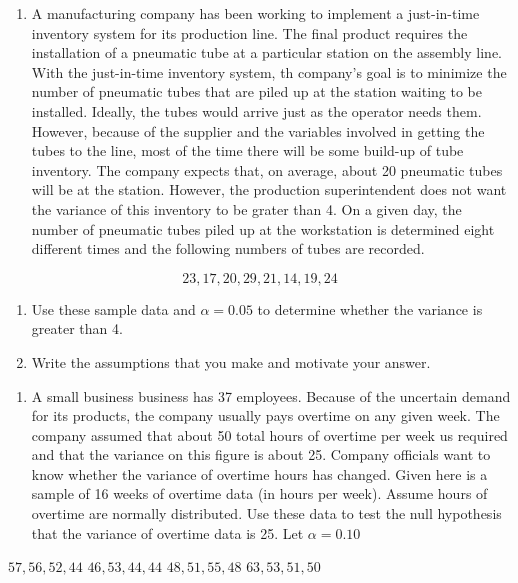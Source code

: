 \documentclass[]{book}
\providecommand{\tightlist}{%
  \setlength{\itemsep}{0pt}\setlength{\parskip}{0pt}}
\begin{document}
\begin{enumerate}
\def\labelenumi{\arabic{enumi}.}
\setcounter{enumi}{7}
\tightlist
\item
  A manufacturing company has been working to implement a just-in-time inventory system for its production line. The final product requires the installation of a pneumatic tube at a particular station on the assembly line. With the just-in-time inventory system, th company's goal is to minimize the number of pneumatic tubes that are piled up at the station waiting to be installed. Ideally, the tubes would arrive just as the operator needs them. However, because of the supplier and the variables involved in getting the tubes to the line, most of the time there will be some build-up of tube inventory. The company expects that, on average, about 20 pneumatic tubes will be at the station. However, the production superintendent does not want the variance of this inventory to be grater than 4. On a given day, the number of pneumatic tubes piled up at the workstation is determined eight different times and the following numbers of tubes are recorded.
\end{enumerate}

\[23, 17, 20, 29, 21, 14, 19, 24\]

\begin{enumerate}
\def\labelenumi{\alph{enumi}.}
\item
  Use these sample data and \(\alpha =0.05\) to determine whether the variance is greater than 4.
\item
  Write the assumptions that you make and motivate your answer.
\end{enumerate}

\begin{enumerate}
\def\labelenumi{\arabic{enumi}.}
\setcounter{enumi}{8}
\tightlist
\item
  A small business business has 37 employees. Because of the uncertain demand for its products, the company usually pays overtime on any given week. The company assumed that about 50 total hours of overtime per week us required and that the variance on this figure is about 25. Company officials want to know whether the variance of overtime hours has changed. Given here is a sample of 16 weeks of overtime data (in hours per week). Assume hours of overtime are normally distributed. Use these data to test the null hypothesis that the variance of overtime data is 25. Let \(\alpha =0.10\)
\end{enumerate}

\(57,56,52,44\)\newline
\(46,53,44,44\) \newline
\(48,51,55,48\) \newline
\(63,53,51,50\) \newline
\end{document}
